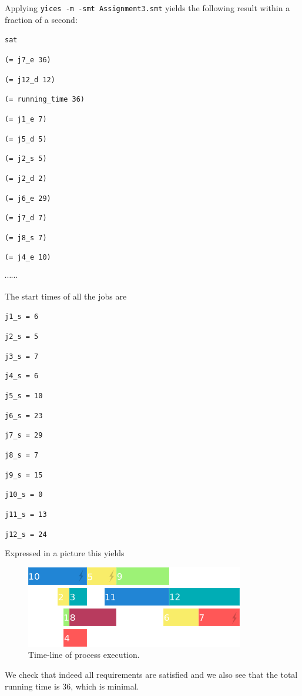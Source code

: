 \documentclass[a4paper]{article}
\begin{document}
Applying {\tt yices -m -smt Assignment3.smt} yields the following result
within a fraction of a second:

{\footnotesize

{\tt sat }

{\tt (= j7\_e 36) }

{\tt (= j12\_d 12) }

{\tt (= running\_time 36) }

{\tt (= j1\_e 7) }

{\tt (= j5\_d 5) }

{\tt (= j2\_s 5) }

{\tt (= j2\_d 2) }

{\tt (= j6\_e 29) }

{\tt (= j7\_d 7) }

{\tt (= j8\_s 7) }

{\tt (= j4\_e 10) }

$\cdots \cdots$ }

The start times of all the jobs are 

{\tt j1\_s = 6 }

{\tt j2\_s = 5 }

{\tt j3\_s = 7 }

{\tt j4\_s = 6 }

{\tt j5\_s = 10 }

{\tt j6\_s = 23 }

{\tt j7\_s = 29 }

{\tt j8\_s = 7 }

{\tt j9\_s = 15 }

{\tt j10\_s = 0 }

{\tt j11\_s = 13 }

{\tt j12\_s = 24 }

Expressed in a picture this yields

\begin{figure}[H]
	\centering
	\includegraphics[scale=1]{timeline-2.png}
	\caption{Time-line of process execution.}
\end{figure}

We check that indeed all requirements are satisfied and we also see that the total running time is 36, which is minimal.\\
\end{document}
